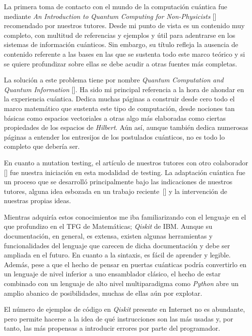 La primera toma de contacto con el mundo de la computación cuántica fue mediante \textit{An Introduction to Quantum Computing for Non-Physicists} [\cite{rieffel2000introduction}] recomendado por nuestros tutores. Desde mi punto de vista es un contenido muy completo, con multitud de referencias y ejemplos y útil para adentrarse en los sistemas de información cuánticos. Sin embargo, su título refleja la ausencia de contenido referente a las bases en las que se sustenta todo este marco teórico y si se quiere profundizar sobre ellas se debe acudir a otras fuentes más completas.

La solución a este problema tiene por nombre \textit{Quantum Computation and Quantum Information} [\cite{nielsen2001quantum}]. Ha sido mi principal referencia a la hora de ahondar en la experiencia cuántica. Dedica muchas páginas a construir desde cero todo el marco matemático que sustenta este tipo de computación, desde nociones tan básicas como espacios vectoriales a otras algo más elaboradas como ciertas propiedades de los espacios de \textit{Hilbert}. Aún así, aunque también dedica numerosas páginas a entender los entresijos de los postulados cuánticos, no es todo lo completo que debería ser.

En cuanto a mutation testing, el artículo de nuestros tutores con otro colaborador [\cite{hierons2010mutation}] fue nuestra iniciación en esta modalidad de testing. La adaptación cuántica fue un proceso que se desarrolló principalmente bajo las indicaciones de nuestros tutores, alguna idea esbozada en un trabajo reciente~[\cite{usaolaquantum}] y la intervención de nuestras propias ideas.

Mientras adquiría estos conocimientos me iba familiarizando con el lenguaje en el que profundizo en el TFG de Matemáticas; \textit{Qiskit} de IBM. Aunque su documentación, en general, es extensa, existen algunas herramientas y funcionalidades del lenguaje que carecen de dicha documentación y debe ser ampliada en el futuro. En cuanto a la sintaxis, es fácil de aprender y legible. Además, pese a que el hecho de pensar en puertas cuánticas podría convertirlo en un lenguaje de nivel inferior a uno ensamblador clásico, el hecho de estar combinado con un lenguaje de alto nivel multiparadigma como \textit{Python} abre un amplio abanico de posibilidades, muchas de ellas aún por explotar.

El número de ejemplos de código en \textit{Qiskit} presente en Internet no es abundante, pero permite hacerse a la idea de qué instrucciones son las más usadas y, por tanto, las más propensas a introducir errores por parte del programador.

